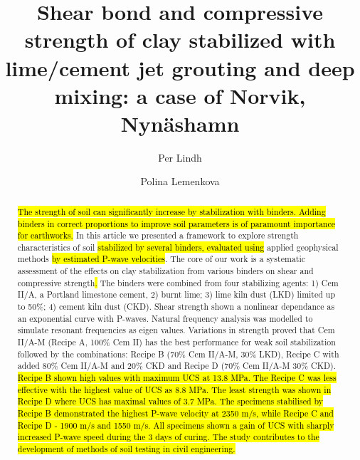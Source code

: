 \documentclass[USenglish,twocolumn]{article}
\begin{document}
 
\author[1]{Per Lindh}
\author*[2]{Polina Lemenkova}

  \title{\huge Shear bond and compressive strength of clay stabilized with lime/cement jet grouting and deep mixing: a case of Norvik, Nynäshamn}
  

\begin{abstract}
{\hl{The strength of soil can significantly increase by stabilization with binders. Adding binders in correct proportions to improve soil parameters is of paramount importance for earthworks. }In this article we presented a framework to explore strength characteristics of soil\hl{ stabilized by several binders, evaluated using }applied geophysical methods\hl{ by estimated P-wave velocities}. The core of our work is a systematic assessment of the effects on clay stabilization from various binders on shear and compressive strength\hl{. }The binders were combined from four stabilizing agents: 1) Cem II/A, a Portland limestone cement, 2) burnt lime; 3) lime kiln dust (LKD) limited up to 50\%; 4) cement kiln dust (CKD). Shear strength shown a nonlinear dependance as an exponential curve with P-waves. Natural frequency analysis was modelled to simulate resonant frequencies as eigen values. Variations in strength proved that Cem II/A-M (Recipe A, 100\% Cem II) has the best performance for weak soil stabilization followed by the combinations: Recipe B (70\% Cem II/A-M, 30\% LKD), Recipe C with added 80\% Cem II/A-M and 20\% CKD and Recipe D (70\% Cem II/A-M 30\% CKD). \hl{Recipe B shown high values with maximum UCS at 13.8 MPa. The Recipe C was less effective with the highest value of UCS as 8.8 MPa. The least strength was shown in Recipe D where UCS  has maximal values of 3.7 MPa. The specimens stabilised by Recipe B demonstrated the highest P-wave velocity at 2350 m/s, while Recipe C and Recipe D - 1900 m/s and 1550 m/s. All specimens shown a gain of UCS with sharply increased P-wave speed during the 3 days of curing. The study contributes to the development of methods of soil testing in civil engineering.}
}
\end{abstract}
 
\end{document}
